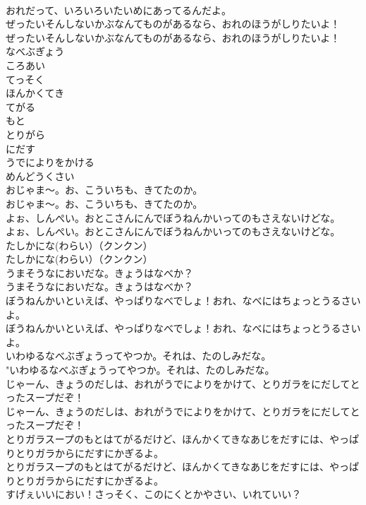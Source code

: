 \documentclass[8pt]{extreport}
\begin{document}
\begin{CJK}{UTF8}{min}
\\	おれだって、いろいろいたいめにあってるんだよ。 
\\	ぜったいそんしないかぶなんてものがあるなら、おれのほうがしりたいよ！	
\\	ぜったいそんしないかぶなんてものがあるなら、おれのほうがしりたいよ！ 
\\	なべぶぎょう
\\	ころあい
\\	てっそく
\\	ほんかくてき
\\	てがる
\\	もと
\\	とりがら
\\	にだす
\\	うでによりをかける
\\	めんどうくさい
\\	おじゃま～。お、こういちも、きてたのか。	
\\	おじゃま～。お、こういちも、きてたのか。 
\\	よぉ、しんぺい。おとこさんにんでぼうねんかいってのもさえないけどな。	
\\	よぉ、しんぺい。おとこさんにんでぼうねんかいってのもさえないけどな。 
\\	たしかにな(わらい）（クンクン）	
\\	たしかにな(わらい）（クンクン） 
\\	うまそうなにおいだな。きょうはなべか？	
\\	うまそうなにおいだな。きょうはなべか？ 
\\	ぼうねんかいといえば、やっぱりなべでしょ！おれ、なべにはちょっとうるさいよ。	
\\	ぼうねんかいといえば、やっぱりなべでしょ！おれ、なべにはちょっとうるさいよ。 
\\	いわゆるなべぶぎょうってやつか。それは、たのしみだな。	
\\	"いわゆるなべぶぎょうってやつか。それは、たのしみだな。 
\\	じゃーん、きょうのだしは、おれがうでによりをかけて、とりガラをにだしてとったスープだぞ！	
\\	じゃーん、きょうのだしは、おれがうでによりをかけて、とりガラをにだしてとったスープだぞ！ 
\\	とりガラスープのもとはてがるだけど、ほんかくてきなあじをだすには、やっぱりとりガラからにだすにかぎるよ。	
\\	とりガラスープのもとはてがるだけど、ほんかくてきなあじをだすには、やっぱりとりガラからにだすにかぎるよ。 
\\	すげぇいいにおい！さっそく、このにくとかやさい、いれていい？	

\end{CJK}
\end{document}
